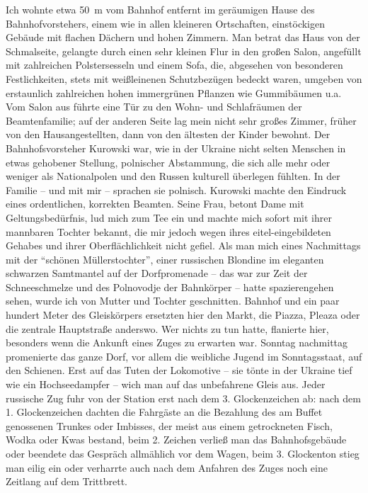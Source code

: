 Ich wohnte etwa 50~m vom Bahnhof entfernt im geräumigen Hause des Bahnhofvorstehers, einem wie in allen kleineren Ortschaften, einstöckigen Gebäude mit flachen Dächern und hohen Zimmern. Man betrat das Haus von der Schmalseite, gelangte durch einen sehr kleinen Flur in den großen Salon, angefüllt mit zahlreichen Polstersesseln und einem Sofa, die, abgesehen von besonderen Festlichkeiten, stets mit weißleinenen Schutzbezügen bedeckt waren, umgeben von erstaunlich zahlreichen hohen immergrünen Pflanzen wie Gummibäumen u.a. Vom Salon aus führte eine Tür zu den Wohn- und Schlafräumen der Beamtenfamilie; auf der anderen Seite lag mein nicht sehr großes Zimmer, früher von den Hausangestellten, dann von den ältesten der Kinder bewohnt. Der Bahnhofsvorsteher Kurowski war, wie in der Ukraine nicht selten Menschen in etwas gehobener Stellung, polnischer Abstammung, die sich alle mehr oder weniger als Nationalpolen und den Russen kulturell überlegen fühlten. In der Familie -- und mit mir -- sprachen sie polnisch. Kurowski machte den Eindruck eines ordentlichen, korrekten Beamten. Seine Frau, betont Dame mit Geltungsbedürfnis, lud mich zum Tee ein und machte mich sofort mit ihrer mannbaren Tochter bekannt, die mir jedoch wegen ihres eitel-eingebildeten Gehabes und ihrer Oberflächlichkeit nicht gefiel. Als man mich eines Nachmittags mit der \enquote{schönen Müllerstochter}, einer russischen Blondine im eleganten schwarzen Samtmantel auf der Dorfpromenade -- das war zur Zeit der Schneeschmelze und des Polnovodje der Bahnkörper -- hatte spazierengehen sehen, wurde ich von Mutter und Tochter geschnitten. Bahnhof und ein paar hundert Meter des Gleiskörpers ersetzten hier den Markt, die Piazza, Pleaza oder die zentrale Hauptstraße anderswo. Wer nichts zu tun hatte, flanierte hier, besonders wenn die Ankunft eines Zuges zu erwarten war. Sonntag nachmittag promenierte das ganze Dorf, vor allem die weibliche Jugend im Sonntagsstaat, auf den Schienen. Erst auf das Tuten der Lokomotive -- sie tönte in der Ukraine tief wie ein Hochseedampfer -- wich man auf das unbefahrene Gleis aus. Jeder russische Zug fuhr von der Station erst nach dem 3. Glockenzeichen ab: nach dem 1. Glockenzeichen dachten die Fahrgäste an die Bezahlung des am Buffet genossenen Trunkes oder Imbisses, der meist aus einem getrockneten Fisch, Wodka oder Kwas bestand, beim 2. Zeichen verließ man das Bahnhofsgebäude oder beendete das Gespräch allmählich vor dem Wagen, beim 3. Glockenton stieg man eilig ein oder verharrte auch nach dem Anfahren des Zuges noch eine Zeitlang auf dem Trittbrett.

